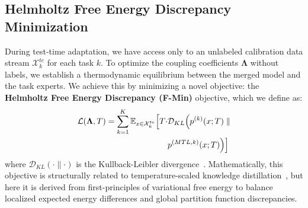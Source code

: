 \subsection{Helmholtz Free Energy Discrepancy Minimization}
During test-time adaptation, we have access only to an unlabeled calibration data stream $\mathcal{X}_k^{te}$ for each task $k$. To optimize the coupling coefficients $\boldsymbol{\Lambda}$ without labels, we establish a thermodynamic equilibrium between the merged model and the task experts. We achieve this by minimizing a novel objective: the \textbf{Helmholtz Free Energy Discrepancy (F-Min)} objective, which we define as:
\begin{align}
\label{eq:f_min_obj}
\mathcal{L}(\boldsymbol{\Lambda}, T) = \sum_{k=1}^K \mathbb{E}_{x \in \mathcal{X}_k^{te}} \Big[ T \cdot &\mathcal{D}_{KL} \Big( p^{(k)}(x; T) \parallel \notag \\
&p^{(MTL, k)}(x; T) \Big) \Big]
\end{align}
where $\mathcal{D}_{KL}(\cdot \parallel \cdot)$ is the Kullback-Leibler divergence~\cite{kullback1951information}. Mathematically, this objective is structurally related to temperature-scaled knowledge distillation~\cite{hinton2015distilling}, but here it is derived from first-principles of variational free energy to balance localized expected energy differences and global partition function discrepancies. 

